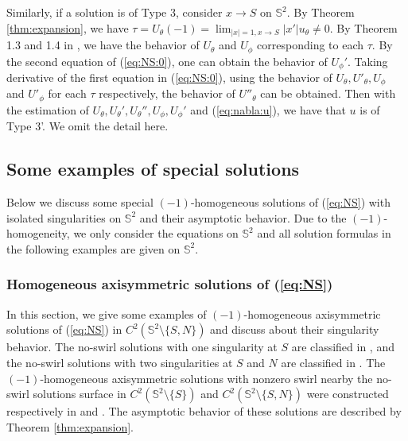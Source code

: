 \documentclass[12pt]{article}
\begin{document}
Similarly, if a solution is of Type 3, consider $x\to S$ on $\mathbb{S}^2$. By Theorem \ref{thm:expansion}, we have $\tau=U_{\theta}(-1)=\lim_{|x|=1, x\to S}|x'|u_{\theta}\ne 0$. By Theorem 1.3 and 1.4 in \cite{LLY1}, we have the behavior of $U_{\theta}$ and $U_{\phi}$ corresponding to each $\tau$. By the second equation of (\ref{eq:NS:0}), one can obtain the behavior of $U_{\phi}'$. Taking derivative of the first equation in (\ref{eq:NS:0}), using the behavior of $U_{\theta}, U'_{\theta}, U_{\phi}$ and $U'_{\phi}$ for each $\tau$ respectively, the behavior of $U''_{\theta}$ can be obtained. Then with the estimation of $U_{\theta}, U_{\theta}', U_{\theta}'', U_{\phi}, U_{\phi}'$ and (\ref{eq:nabla:u}), we have that $u$ is of Type 3'. We omit the detail here. 

\subsection{Some examples of special solutions}

Below we discuss some special $(-1)$-homogeneous solutions of (\ref{eq:NS}) with isolated singularities on $\mathbb{S}^2$ and their asymptotic behavior. Due to the $(-1)$-homogeneity, we only consider the equations on $\mathbb{S}^2$ and all solution formulas in the following examples are given on $\mathbb{S}^2$. 

\subsubsection{Homogeneous axisymmetric solutions of (\ref{eq:NS})} 
 
In this section, we give some examples of $(-1)$-homogeneous axisymmetric solutions of (\ref{eq:NS}) in $C^2(\mathbb{S}^2\setminus\{S, N\})$ and discuss about their singularity behavior. The no-swirl solutions with one singularity at $S$ are classified in \cite{LLY1}, and the no-swirl solutions with two singularities at $S$ and $N$ are classified in \cite{LLY2}. The $(-1)$-homogeneous axisymmetric solutions with nonzero swirl nearby the no-swirl solutions surface in $C^2(\mathbb{S}^2\setminus\{S\})$ and $C^2(\mathbb{S}^2\setminus\{S, N\})$ were constructed respectively in \cite{LLY1} and \cite{LLY3}.
The asymptotic behavior of these solutions are described by Theorem \ref{thm:expansion}. 
\end{document}

